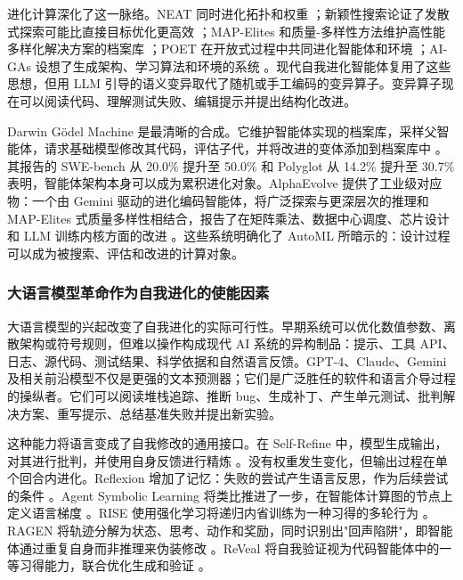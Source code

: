 进化计算深化了这一脉络。NEAT 同时进化拓扑和权重 \cite{stanley2002evolving}；新颖性搜索论证了发散式探索可能比直接目标优化更高效 \cite{lehman2011abandoning}；MAP-Elites 和质量-多样性方法维护高性能多样化解决方案的档案库 \cite{mouret2015illuminating}；POET 在开放式过程中共同进化智能体和环境 \cite{wang2019poet}；AI-GAs 设想了生成架构、学习算法和环境的系统 \cite{clune2019ai}。现代自我进化智能体复用了这些思想，但用 LLM 引导的语义变异取代了随机或手工编码的变异算子。变异算子现在可以阅读代码、理解测试失败、编辑提示并提出结构化改进。

Darwin G{\"o}del Machine 是最清晰的合成。它维护智能体实现的档案库，采样父智能体，请求基础模型修改其代码，评估子代，并将改进的变体添加到档案库中 \cite{darwingodelmachine2025}。其报告的 SWE-bench 从 20.0\% 提升至 50.0\% 和 Polyglot 从 14.2\% 提升至 30.7\% 表明，智能体架构本身可以成为累积进化对象。AlphaEvolve 提供了工业级对应物：一个由 Gemini 驱动的进化编码智能体，将广泛探索与更深层次的推理和 MAP-Elites 式质量多样性相结合，报告了在矩阵乘法、数据中心调度、芯片设计和 LLM 训练内核方面的改进 \cite{alphaevolve2025}。这些系统明确化了 AutoML 所暗示的：设计过程可以成为被搜索、评估和改进的计算对象。

\subsubsection{大语言模型革命作为自我进化的使能因素}

大语言模型的兴起改变了自我进化的实际可行性。早期系统可以优化数值参数、离散架构或符号规则，但难以操作构成现代 AI 系统的异构制品：提示、工具 API、日志、源代码、测试结果、科学依据和自然语言反馈。GPT-4、Claude、Gemini 及相关前沿模型不仅是更强的文本预测器；它们是广泛胜任的软件和语言介导过程的操纵者。它们可以阅读堆栈追踪、推断 bug、生成补丁、产生单元测试、批判解决方案、重写提示、总结基准失败并提出新实验。

这种能力将语言变成了自我修改的通用接口。在 Self-Refine 中，模型生成输出，对其进行批判，并使用自身反馈进行精炼 \cite{selfrefine2023}。没有权重发生变化，但输出过程在单个回合内进化。Reflexion 增加了记忆：失败的尝试产生语言反思，作为后续尝试的条件 \cite{reflexion2023}。Agent Symbolic Learning 将类比推进了一步，在智能体计算图的节点上定义语言梯度 \cite{agentsymboliclearning2024}。RISE 使用强化学习将递归内省训练为一种习得的多轮行为 \cite{qu2024rise}。RAGEN 将轨迹分解为状态、思考、动作和奖励，同时识别出"回声陷阱"，即智能体通过重复自身而非推理来伪装修改 \cite{wang2025ragen}。ReVeal 将自我验证视为代码智能体中的一等习得能力，联合优化生成和验证 \cite{reveal2025}。

